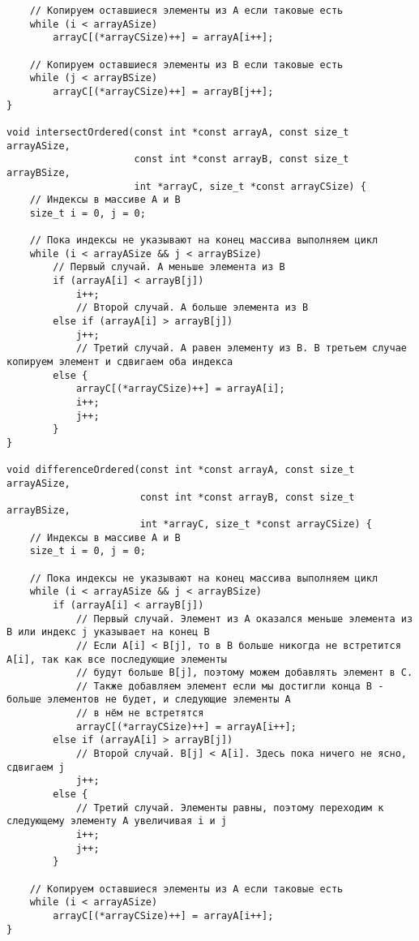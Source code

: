 \documentclass[a4paper,14pt]{extarticle}
\begin{document}
\begin{enumerate}[№1. ]
\begin{enumerate}[label=\asbuk*),ref=\asbuk*]
\begin{verbatim}
    // Копируем оставшиеся элементы из A если таковые есть
    while (i < arrayASize)
        arrayC[(*arrayCSize)++] = arrayA[i++];

    // Копируем оставшиеся элементы из B если таковые есть
    while (j < arrayBSize)
        arrayC[(*arrayCSize)++] = arrayB[j++];
}

void intersectOrdered(const int *const arrayA, const size_t arrayASize,
                      const int *const arrayB, const size_t arrayBSize,
                      int *arrayC, size_t *const arrayCSize) {
    // Индексы в массиве A и B
    size_t i = 0, j = 0;

    // Пока индексы не указывают на конец массива выполняем цикл
    while (i < arrayASize && j < arrayBSize)
        // Первый случай. A меньше элемента из B
        if (arrayA[i] < arrayB[j])
            i++;
            // Второй случай. A больше элемента из B
        else if (arrayA[i] > arrayB[j])
            j++;
            // Третий случай. A равен элементу из B. В третьем случае копируем элемент и сдвигаем оба индекса
        else {
            arrayC[(*arrayCSize)++] = arrayA[i];
            i++;
            j++;
        }
}

void differenceOrdered(const int *const arrayA, const size_t arrayASize,
                       const int *const arrayB, const size_t arrayBSize,
                       int *arrayC, size_t *const arrayCSize) {
    // Индексы в массиве A и B
    size_t i = 0, j = 0;

    // Пока индексы не указывают на конец массива выполняем цикл
    while (i < arrayASize && j < arrayBSize)
        if (arrayA[i] < arrayB[j])
            // Первый случай. Элемент из A оказался меньше элемента из B или индекс j указывает на конец B
            // Если A[i] < B[j], то в B больше никогда не встретится A[i], так как все последующие элементы
            // будут больше B[j], поэтому можем добавлять элемент в C.
            // Также добавляем элемент если мы достигли конца B - больше элементов не будет, и следующие элементы A
            // в нём не встретятся
            arrayC[(*arrayCSize)++] = arrayA[i++];
        else if (arrayA[i] > arrayB[j])
            // Второй случай. B[j] < A[i]. Здесь пока ничего не ясно, сдвигаем j
            j++;
        else {
            // Третий случай. Элементы равны, поэтому переходим к следующему элементу A увеличивая i и j
            i++;
            j++;
        }

    // Копируем оставшиеся элементы из A если таковые есть
    while (i < arrayASize)
        arrayC[(*arrayCSize)++] = arrayA[i++];
}


\end{verbatim}
\end{enumerate}
\end{enumerate}
\end{document}
